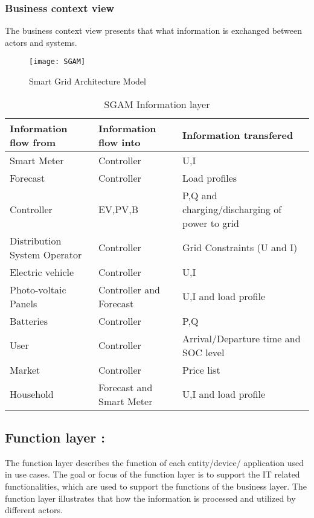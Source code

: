  \subsubsection{Business context view}
 The business context view presents that what information is exchanged between actors and systems. 
 \begin{figure}[h!b]
	\centering
	\texttt{[image: SGAM]}
	\caption{Smart Grid Architecture Model }
	\label{fig:Smart Grid Architecture Model }
\end{figure}
 \begin{table}[h!b]
	\centering
	\begin{tabular} { | l | p{2.5cm} | l | }
    \hline
		\textbf{Information flow from} & \textbf{Information flow into} & \textbf{Information transfered} \\ 
		\hline
		Smart Meter & Controller & U,I \\ 
		\hline
		 Forecast & Controller &  Load profiles \\ 
        \hline
         Controller & EV,PV,B & P,Q and charging/discharging of power to grid \\ 
		\hline
         Distribution System Operator & Controller  &  Grid Constraints (U and I) \\ 
		\hline
         Electric vehicle & Controller & U,I \\
		\hline
         Photo-voltaic Panels & Controller and Forecast & U,I and load profile  \\ 
		\hline
         Batteries & Controller & P,Q \\
		\hline
         User & Controller & Arrival/Departure time and SOC level \\ 
         \hline
         Market & Controller & Price list \\
		\hline
        Household & Forecast and Smart Meter & U,I and load profile \\ 
		\hline
	\end{tabular}
    \caption{SGAM Information layer}
    \label{table:5} 
\end{table}
\subsection{Function layer :} 
 
The function layer describes the function of each entity/device/ application used in use cases. The goal or focus of the function layer is to support the IT related functionalities, which are used to support the functions of the business layer. The function layer illustrates that how the information is processed and utilized by different actors. 

